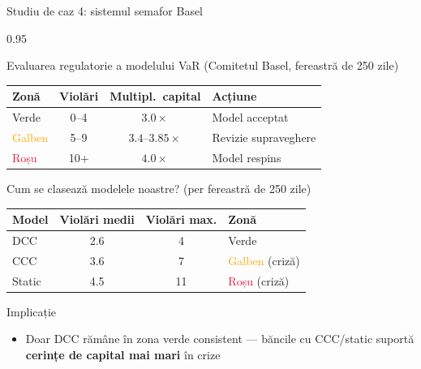 \documentclass[9pt, aspectratio=169, t]{beamer}
\begin{document}
\begin{frame}{Studiu de caz 4: sistemul semafor Basel}
    \begin{cminipage}{0.95\textwidth}
    {\footnotesize
    \begin{block}{Evaluarea regulatorie a modelului VaR (Comitetul Basel, fereastră de 250 zile)}
        \vspace{0.1cm}
        {\small
        \begin{center}
        \begin{tabular}{l|c|c|l}
            \hline
            \textbf{Zonă} & \textbf{Violări} & \textbf{Multipl.\ capital} & \textbf{Acțiune} \\
            \hline
            \textcolor{Forest}{Verde}    & 0--4  & $3.0\times$ & Model acceptat \\
            \textcolor{orange}{Galben}   & 5--9  & $3.4$--$3.85\times$ & Revizie supraveghere \\
            \textcolor{Crimson}{Roșu}    & 10+   & $4.0\times$ & Model respins \\
            \hline
        \end{tabular}
        \end{center}
        }
    \end{block}
    \vspace{-2mm}
    \begin{block}{Cum se clasează modelele noastre? (per fereastră de 250 zile)}
        \vspace{0.1cm}
        {\small
        \begin{center}
        \begin{tabular}{l|c|c|l}
            \hline
            \textbf{Model} & \textbf{Violări medii} & \textbf{Violări max.} & \textbf{Zonă} \\
            \hline
            DCC    & 2.6 & 4  & \textcolor{Forest}{Verde} \\
            CCC    & 3.6 & 7  & \textcolor{orange}{Galben} (criză) \\
            Static & 4.5 & 11 & \textcolor{Crimson}{Roșu} (criză) \\
            \hline
        \end{tabular}
        \end{center}
        }
    \end{block}
    \vspace{-2mm}
    \begin{alertblock}{Implicație}
        \begin{itemize}\setlength{\itemsep}{0pt}
            \item Doar DCC rămâne în zona \textcolor{Forest}{verde} consistent --- băncile cu CCC/static suportă \textbf{cerințe de capital mai mari} în crize
        \end{itemize}
    \end{alertblock}
    }
    \end{cminipage}
\end{frame}
\end{document}
